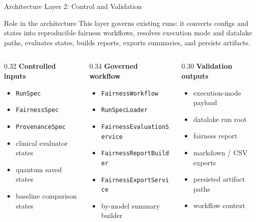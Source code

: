 \documentclass[aspectratio=169,10pt]{beamer}
\begin{document}
\begin{frame}{Architecture Layer 2: Control and Validation}
\small

\begin{block}{Role in the architecture}
This layer governs existing runs: it converts configs and states into reproducible fairness workflows, resolves execution mode and datalake paths, evaluates states, builds reports, exports summaries, and persists artifacts.
\end{block}

\begin{columns}[T]
\begin{column}{0.32\textwidth}
\textbf{\textcolor{phase2green}{Controlled inputs}}
\begin{itemize}
    \item \texttt{RunSpec}
    \item \texttt{FairnessSpec}
    \item \texttt{ProvenanceSpec}
    \item clinical evaluator states
    \item quantum saved states
    \item baseline comparison states
\end{itemize}
\end{column}

\begin{column}{0.34\textwidth}
\textbf{\textcolor{phase2green}{Governed workflow}}
\begin{itemize}
    \item \texttt{FairnessWorkflow}
    \item \texttt{RunSpecLoader}
    \item \texttt{FairnessEvaluationService}
    \item \texttt{FairnessReportBuilder}
    \item \texttt{FairnessExportService}
    \item by-model summary builder
\end{itemize}
\end{column}

\begin{column}{0.30\textwidth}
\textbf{\textcolor{phase2green}{Validation outputs}}
\begin{itemize}
    \item execution-mode payload
    \item datalake run root
    \item fairness report
    \item markdown / CSV exports
    \item persisted artifact paths
    \item workflow context
\end{itemize}
\end{column}
\end{columns}


\end{frame}
\end{document}
